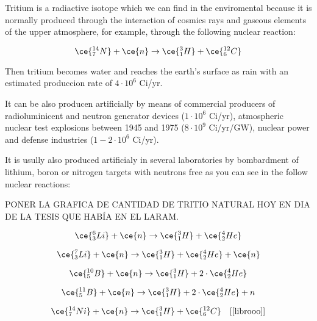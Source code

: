 Tritium is a radiactive isotope which we can find in the enviromental because it is normally produced through the interaction of cosmics rays and gaseous elements of the upper atmosphere, for example, through the following nuclear reaction:

\begin{equation}
\ce{^{14}_{7}N} + \ce{n} \rightarrow \ce{^{3}_{1}H} +  \ce{^{12}_{6}C}
\label{H62}
\end{equation}

Then tritium becomes water and reaches the earth's surface as rain with an estimated produccion rate of $4\cdot 10^6$ Ci/yr. 

It can be also producen artificially by means of commercial producers of radioluminicent and neutron generator devices ($1 \cdot 10^6$ Ci/yr), atmospheric nuclear test explosions between 1945 and 1975 ($8 \cdot 10^9$ Ci/yr/GW), nuclear power and defense industries ($1-2 \cdot 10^6$ Ci/yr). 

It is usully also produced artificialy in several laboratories by bombardment of lithium, boron or nitrogen targets with neutrons free as you can see in the follow nuclear reactions:

PONER LA GRAFICA DE CANTIDAD DE TRITIO NATURAL HOY EN DIA DE LA TESIS QUE HABÍA EN EL LARAM.

\begin{equation}
\ce{^{6}_{3}Li} + \ce{n} \rightarrow \ce{^{3}_{1}H} + \ce{^{4}_{2}He}
\label{capneuLi6}
\end{equation}

\begin{equation}
\ce{^{7}_{3}Li} + \ce{n} \rightarrow \ce{^{3}_{1}H} + \ce{^{4}_{2}He} + \ce{n}
\label{capneuLi7}
\end{equation}

\begin{equation}
\ce{^{10}_{5}B} + \ce{n} \rightarrow \ce{^{3}_{1}H} + 2 \cdot{} \ce{^{4}_{2}He}
\label{capneuB10}
\end{equation}

\begin{equation}
\ce{^{11}_{5}B} + \ce{n} \rightarrow \ce{^{3}_{1}H} + 2 \cdot{} \ce{^{4}_{2}He} + n
\label{capneuB11}
\end{equation}

\begin{equation}
\ce{^{14}_{7}Ni} + \ce{n} \rightarrow \ce{^{3}_{1}H} + \ce{^{12}_{6}C}~~~[\ref{librooo}]
\label{capneuN14}
\end{equation}

